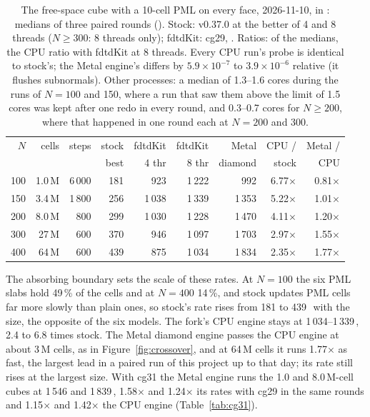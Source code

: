 \begin{table}[H]\centering\small
\begin{tabular}{@{}rrrrrrrrr@{}}
\toprule
$N$ & cells & steps & stock & fdtdKit & fdtdKit & Metal & CPU / & Metal / \\
 & & & best & 4 thr & 8 thr & diamond & stock & CPU \\
\midrule
100 & 1.0\,M & 6\,000 & 181 & 923 & 1\,222 & 992 & 6.77$\times$ & 0.81$\times$ \\
150 & 3.4\,M & 1\,800 & 256 & 1\,038 & 1\,339 & 1\,353 & 5.22$\times$ & 1.01$\times$ \\
200 & 8.0\,M & 800 & 299 & 1\,030 & 1\,228 & 1\,470 & 4.11$\times$ & 1.20$\times$ \\
300 & 27\,M & 600 & 370 & 946 & 1\,097 & 1\,703 & 2.97$\times$ & 1.55$\times$ \\
400 & 64\,M & 600 & 439 & 875 & 1\,034 & 1\,834 & 2.35$\times$ & 1.77$\times$ \\
\bottomrule
\end{tabular}
\caption{The free-space cube with a 10-cell PML on every face, 2026-11-10, in \MC: medians of three paired rounds
(). Stock: v0.37.0 at the better of 4 and 8 threads ($N\ge300$: 8 threads only); fdtdKit:
cg29, . Ratios: of the medians, the CPU ratio with fdtdKit at 8 threads. Every CPU run's probe is
identical to stock's; the Metal engine's differs by $5.9\times10^{-7}$ to $3.9\times10^{-6}$ relative (it flushes
subnormals). Other processes: a median of 1.3--1.6 cores during the runs of $N=100$ and 150, where a run that saw
them above the limit of 1.5 cores was kept after one redo in every round, and 0.3--0.7 cores for
$N\ge200$, where that happened in one round each at $N=200$ and 300.}\label{tab:cube}
\end{table}

The absorbing boundary sets the scale of these rates. At $N=100$ the six PML slabs hold 49\,\% of the cells and at
$N=400$ 14\,\%, and stock updates PML cells far more slowly than plain ones, so stock's rate rises from 181 to
439\,\MC\ with the size, the opposite of the six models. The fork's CPU engine stays at 1\,034--1\,339\,\MC, 2.4 to
6.8 times stock. The Metal diamond engine passes the CPU engine at about 3\,M cells, as in
Figure~\ref{fig:crossover}, and at 64\,M cells it runs 1.77$\times$ as fast, the largest lead in a paired run of
this project up to that day; its rate still rises at the largest size. With cg31 the Metal engine runs the 1.0 and
8.0\,M-cell cubes at 1\,546 and 1\,839\,\MC, 1.58$\times$ and 1.24$\times$ its rates with cg29 in the same rounds and
1.15$\times$ and 1.42$\times$ the CPU engine (Table~\ref{tab:cg31}).


